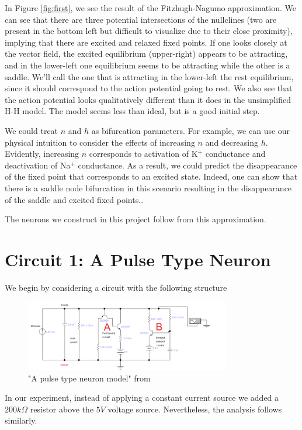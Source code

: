 \documentclass[12]{amsbook}
\newcommand\0{\mathbf{0}}
\newcommand\<{\langle}
\renewcommand\>{\rangle}
\begin{document}
In Figure \ref{fig:first}, we see the result of the Fitzhugh-Nagumo approximation. We can see that there are three potential intersections of the nullclines (two are present in the bottom left but difficult to visualize due to their close proximity), implying that there are excited and relaxed fixed points. If one looks closely at the vector field, the excited equilibrium (upper-right) appears to be attracting, and in the lower-left one equilibrium seems to be attracting while the other is a saddle. We'll call the one that is attracting in the lower-left the rest equilibrium, since it should correspond to the action potential going to rest. We also see that the action potential looks qualitatively different than it does in the unsimplified H-H model. The model seems less than ideal, but is a good initial step. 

We could treat $n$ and $h$ as bifurcation parameters. For example, we can use our physical intuition to consider the effects of increasing $n$ and decreasing $h$. Evidently, increasing $n$ corresponds to activation of K$^+$ conductance and deactivation of Na$^+$ conductance. As a result, we could predict the disappearance of the fixed point that corresponds to an excited state. Indeed, one can show that there is a saddle node bifurcation in this scenario resulting in the disappearance of the saddle and excited fixed points.\cite{keener}.

The neurons we construct in this project follow from this approximation.

\section{Circuit 1: A Pulse Type Neuron}
 
 We begin by considering a circuit with the following structure
 
\begin{figure}[H]
\includegraphics[width=0.8\textwidth]{exercise1-0}
\caption{"A pulse type neuron model" from \cite{maeda2000pulse}}
\end{figure}

In our experiment, instead of applying a constant current source we added a $200k\Omega$ resistor above the $5V$ voltage source. Nevertheless, the analysis follows similarly.
\end{document}
